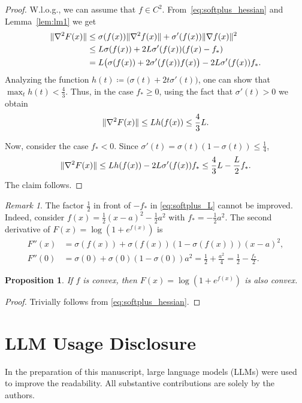\documentclass{article}
\DeclarePairedDelimiter{\norm}{\lVert}{\rVert}
\newcommand*{\eqset}{\coloneqq}
\theoremstyle{plain}
\newtheorem{proposition}[theorem]{Proposition}
\theoremstyle{definition}
\theoremstyle{remark}
\newtheorem{remark}[theorem]{Remark}
\begin{document}
\begin{proof}
    W.l.o.g., we can assume that $f \in C^2$.
    From~\eqref{eq:softplus_hessian} and Lemma~\ref{lem:lm1} we get
    \begin{align*}
        \norm{\nabla^2 F(x)} &\le \sigma(f(x)) \norm{\nabla^2 f(x)} + \sigma'(f(x)) \norm{\nabla f(x)}^2 \\
        &\le L \sigma(f(x)) + 2 L \sigma'(f(x)) (f(x)-f_*) \\
        &= L \bigl(\sigma(f(x)) + 2 \sigma'(f(x)) f(x)\bigr) - 2 L \sigma'(f(x)) f_* .
    \end{align*}
    Analyzing the function $h(t) \eqset \bigl(\sigma(t) + 2 t \sigma'(t)\bigr)$, one can show that $\max_t h(t) < \frac{4}{3}$.
    Thus, in the case $f_* \ge 0$, using the fact that $\sigma'(t) > 0$ we obtain
    \[
    \norm{\nabla^2 F(x)} \le L h(f(x)) \le \frac{4}{3} L .
    \]

    Now, consider the case $f_* < 0$. Since $\sigma'(t) = \sigma(t) (1 - \sigma(t)) \le \frac{1}{4}$, 
    \[
    \norm{\nabla^2 F(x)} \le L h(f(x)) - 2 L \sigma'(f(x)) f_* 
    \le \frac{4}{3} L - \frac{L}{2} f_* .
    \]
    The claim follows.
    
\end{proof}

\begin{remark}
    The factor \(\frac{1}{2}\) in front of \( -f_* \) in \eqref{eq:softplus_L} cannot be improved. Indeed, consider \( f(x) = \frac{1}{2}(x-a)^2-\frac{1}{2}a^2 \) with \( f_* = -\frac{1}{2}a^2 \). The second derivative of \( F(x) = \log (1 + e^{f(x)}) \) is
    \begin{align*}
        F''(x) &= \sigma(f(x)) + \sigma(f(x)) \left(1 - \sigma(f(x))\right) (x-a)^2, \\
        F''(0) &= \sigma(0) + \sigma(0) \left( 1 - \sigma(0)\right) a^2 = \frac{1}{2} + \frac{a^2}{4} = \frac{1}{2} - \frac{f_*}{2} .
    \end{align*}
\end{remark}


\begin{proposition}
    If \( f \) is convex, then \( F(x) = \log (1 + e^{f(x)}) \) is also convex.
\end{proposition}
\begin{proof}
    Trivially follows from \eqref{eq:softplus_hessian}.
\end{proof}


\section{LLM Usage Disclosure}
In the preparation of this manuscript, large language models (LLMs) were used to improve the readability.
All substantive contributions are solely by the authors.

\newpage
% 
\end{document}
